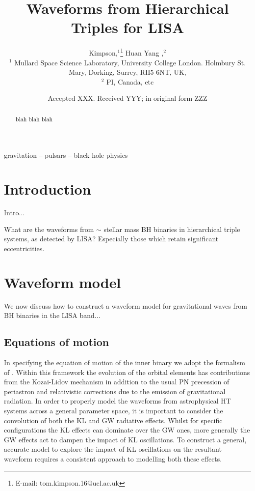 \documentclass[a4paper,fleqn,usenatbib]{mnras}
\title[Hierarchical Triples]{Waveforms from Hierarchical Triples for LISA}
\author[T. Kimpson et al.]{
 Kimpson,$^{1}$\thanks{E-mail: tom.kimpson.16@ucl.ac.uk}
Huan Yang  ,$^{2}$
\\
$^{1}$ Mullard Space Science Laboratory, University College London. Holmbury St. Mary, Dorking, Surrey, RH5 6NT, UK, \\
$^{2}$ PI, Canada, etc
}
\date{Accepted XXX. Received YYY; in original form ZZZ}
\begin{document}
\label{firstpage}
\pagerange{\pageref{firstpage}--\pageref{lastpage}}
\maketitle

\begin{abstract}
blah blah blah
\end{abstract}

\begin{keywords}
gravitation -- pulsars -- black hole physics
\end{keywords}



\section{Introduction}
Intro...

\noindent What are the waveforms from $\sim$ stellar mass BH binaries in hierarchical triple systems, as detected by LISA? Especially those which retain significant eccentricities.

\section{Waveform model}
We now discuss how to construct a waveform model for gravitational waves from BH binaries in the LISA band...



\subsection{Equations of motion}

In specifying the equation of motion of the inner binary we adopt the formalism of \citep{Randall2018}. Within this framework the evolution of the orbital elements has contributions from the Kozai-Lidov mechanism in addition to the usual PN precession of periastron and relativistic corrections due to the emission of gravitational radiation. In order to properly model the waveforms from astrophysical HT systems across a general parameter space, it is important to consider the convolution of both the KL and GW radiative effects. Whilst for specific configurations the KL effects can dominate over the GW ones, more generally the GW effects act to dampen the impact of KL oscillations. To construct a general, accurate model to explore the impact of KL oscillations on the resultant waveform requires a consistent approach to modelling both these effects. \newline 
\end{document}
